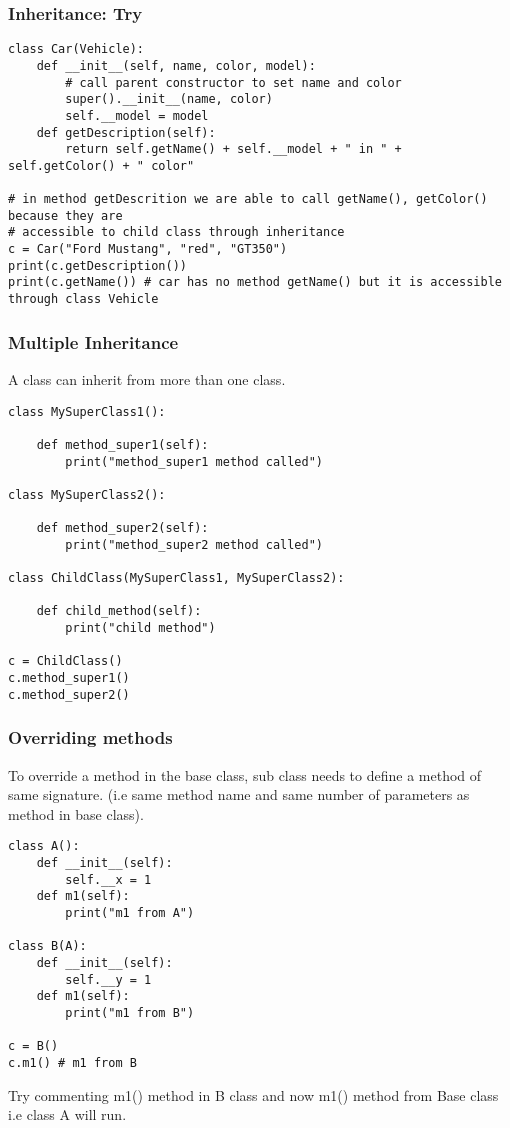 \begin{frame}[fragile]\frametitle{Inheritance: Try}

\begin{lstlisting}
class Car(Vehicle):
    def __init__(self, name, color, model):
        # call parent constructor to set name and color  
        super().__init__(name, color)       
        self.__model = model
    def getDescription(self):
        return self.getName() + self.__model + " in " + self.getColor() + " color"
 
# in method getDescrition we are able to call getName(), getColor() because they are 
# accessible to child class through inheritance
c = Car("Ford Mustang", "red", "GT350")
print(c.getDescription())
print(c.getName()) # car has no method getName() but it is accessible through class Vehicle
\end{lstlisting}
\end{frame}



\begin{frame}[fragile]\frametitle{Multiple Inheritance}

A class can inherit from more than one class. 
\begin{lstlisting}
class MySuperClass1():
 
    def method_super1(self):
        print("method_super1 method called")
 
class MySuperClass2():
 
    def method_super2(self):
        print("method_super2 method called")
 
class ChildClass(MySuperClass1, MySuperClass2):
 
    def child_method(self):
        print("child method")
 
c = ChildClass()
c.method_super1()
c.method_super2()
\end{lstlisting}
\end{frame}

\begin{frame}[fragile]\frametitle{Overriding methods}
To override a method in the base class, sub class needs to define a method of same signature. (i.e same method name and same number of parameters as method in base class).

\begin{lstlisting}
class A():
    def __init__(self):
        self.__x = 1
    def m1(self):
        print("m1 from A")
 
class B(A):
    def __init__(self):
        self.__y = 1
    def m1(self):
        print("m1 from B")
 
c = B()
c.m1() # m1 from B
\end{lstlisting}
Try commenting m1()  method  in B  class and now m1()  method from Base class i.e class A  will run.
\end{frame}


